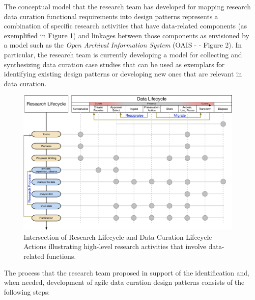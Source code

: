 \documentclass[paper]{ijdc-v9}
\begin{document}
The conceptual model that the research team has developed for mapping
research data curation functional requirements into design patterns
represents a combination of specific research activities that have
data-related components (as exemplified in Figure 1) and linkages
between those components as envisioned by a model such as the \emph{Open
Archival Information System} (OAIS -
\autocites{book_reference_2012}{_iso_2012}{oclc_open_2014} - Figure 2).
In particular, the research team is currently developing a model for
collecting and synthesizing data curation case studies that can be used
as exemplars for identifying existing design patterns or developing new
ones that are relevant in data curation.

\begin{figure}[htbp]
\centering
\includegraphics[width=5.00000in]{Research-DataLifecycleIntegration.png}
\caption{Intersection of Research Lifecycle \autocite{_how_2014} and
Data Curation Lifecycle Actions
\autocite{digital_curation_centre_dcc_dcc_nd} illustrating high-level
research activities that involve data-related functions.}
\end{figure}

The process that the research team proposed in support of the
identification and, when needed, development of agile data curation
design patterns consists of the following steps:
\end{document}
